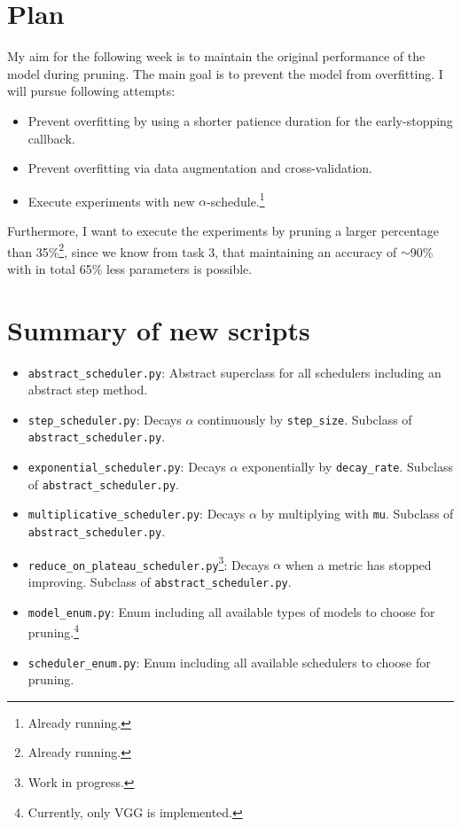 \documentclass[10pt,twocolumn,letterpaper]{article}
\begin{document}
\section{Plan}
My aim for the following week is to maintain the original performance of the model during pruning.
The main goal is to prevent the model from overfitting.
I will pursue following attempts:
\begin{itemize}
	\item Prevent overfitting by using a shorter patience duration for the early-stopping callback.
	\item Prevent overfitting via data augmentation and cross-validation.
	\item Execute experiments with new $\alpha$-schedule.\footnote{Already running.}
\end{itemize}
Furthermore, I want to execute the experiments by pruning a larger percentage than 35\%\footnote{Already running.}, since we know from task 3, that maintaining an accuracy of $\sim$90\% with in total 65\% less parameters is possible.

\section{Summary of new scripts}
\begin{itemize}
	\item \texttt{abstract\_scheduler.py}: Abstract superclass for all schedulers including an abstract step method.
	\item \texttt{step\_scheduler.py}: Decays $\alpha$ continuously by \texttt{step\_size}.
		Subclass of \texttt{abstract\_scheduler.py}.
	\item \texttt{exponential\_scheduler.py}: Decays $\alpha$ exponentially by \texttt{decay\_rate}.
		Subclass of \texttt{abstract\_scheduler.py}.
	\item \texttt{multiplicative\_scheduler.py}: Decays $\alpha$ by multiplying with \texttt{mu}.
		Subclass of \texttt{abstract\_scheduler.py}.
	\item \texttt{reduce\_on\_plateau\_scheduler.py}\footnote{Work in progress.}: Decays $\alpha$ when a metric has stopped improving.
		Subclass of \texttt{abstract\_scheduler.py}.
	\item \texttt{model\_enum.py}: Enum including all available types of models to choose for pruning.\footnote{Currently, only VGG is implemented.}
	\item \texttt{scheduler\_enum.py}: Enum including all available schedulers to choose for pruning.
\end{itemize}

{\small


}
\end{document}
